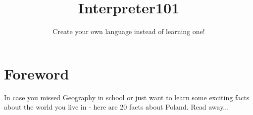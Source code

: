 \documentclass{42-en}
\begin{document}
                           \title{Interpreter101}
                          \subtitle{Create your own language instead of learning one!}


\maketitle

\tableofcontents


\chapter{Foreword}

    In case you missed Geography in school or just want to learn some exciting facts about the world you live in - here are 20 facts about Poland. Read away...\\
\end{document}
